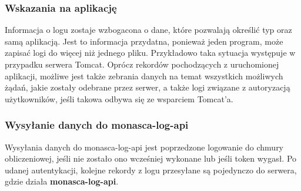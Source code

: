         \subsubsection{Wskazania na aplikację}
            Informacja o logu zostaje wzbogacona o dane, które pozwalają określić typ oraz samą aplikacją.
            Jest to informacja przydatna, ponieważ jeden program, może zapisać logi do więcej niż jednego pliku.
            Przykładowo taka sytuacja występuje w przypadku serwera Tomcat. Oprócz rekordów pochodzących
            z uruchomionej aplikacji, możliwe jest także zebrania danych na temat wszystkich możliwych
            żądań, jakie zostały odebrane przez serwer, a także logi związane z autoryzacją użytkowników, jeśli
            takowa odbywa się ze wsparciem Tomcat'a.
            
         \subsubsection{Wysyłanie danych do monasca-log-api}
             Wysyłania danych do monasca-log-api jest poprzedzone logowanie do chmury obliczeniowej, jeśli nie
             zostało ono wcześniej wykonane lub jeśli token wygasł. Po udanej autentykacji, kolejne rekordy
             z logu przesyłane są pojedynczo do serwera, gdzie działa \textbf{monasca-log-api}.